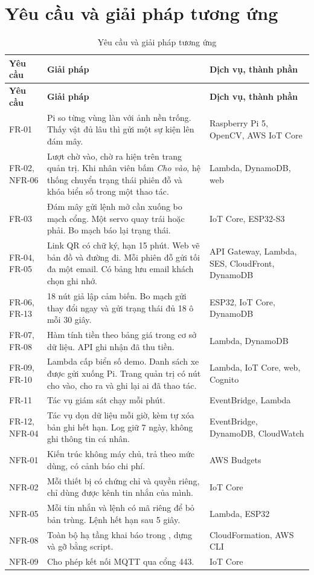 \section{Yêu cầu và giải pháp tương ứng}

\begin{longtable}{@{}P{2.4cm}P{6.6cm}P{5.1cm}@{}}
\caption{Yêu cầu và giải pháp tương ứng}\label{tab:anhxa}\\
\toprule
\textbf{Yêu cầu} & \textbf{Giải pháp} & \textbf{Dịch vụ, thành phần} \\ \midrule
\endfirsthead
\toprule
\textbf{Yêu cầu} & \textbf{Giải pháp} & \textbf{Dịch vụ, thành phần} \\ \midrule
\endhead
FR-01 & Pi so từng vùng làn với ảnh nền trống. Thấy vật đủ lâu thì gửi một sự kiện lên đám mây. & Raspberry Pi 5, OpenCV, AWS IoT Core \\
FR-02, NFR-06 & Lượt chờ vào, chờ ra hiện trên trang quản trị. Khi nhân viên bấm \emph{Cho vào}, hệ thống chuyển trạng thái phiên đỗ và khóa biển số trong một thao tác. & Lambda, DynamoDB, web \\
FR-03 & Đám mây gửi lệnh mở cần xuống bo mạch cổng. Một servo quay trái hoặc phải. Bo mạch báo lại trạng thái. & IoT Core, ESP32-S3 \\
FR-04, FR-05 & Link QR có chữ ký, hạn 15 phút. Web vẽ bản đồ và đường đi. Mỗi phiên đỗ gửi tối đa một email. Có bảng lưu email khách chọn ghi nhớ. & API Gateway, Lambda, SES, CloudFront, DynamoDB \\
FR-06, FR-13 & 18 nút giả lập cảm biến. Bo mạch gửi thay đổi ngay và gửi trạng thái đủ 18 ô mỗi 30 giây. & ESP32, IoT Core, DynamoDB \\
FR-07, FR-08 & Hàm tính tiền theo bảng giá trong cơ sở dữ liệu. API ghi nhận đã thu tiền. & Lambda, DynamoDB \\
FR-09, FR-10 & Lambda cấp biển số demo. Danh sách xe được gửi xuống Pi. Trang quản trị có nút cho vào, cho ra và ghi lại ai đã thao tác. & Lambda, IoT Core, web, Cognito \\
FR-11 & Tác vụ giám sát chạy mỗi phút. & EventBridge, Lambda \\
FR-12, NFR-04 & Tác vụ dọn dữ liệu mỗi giờ, kèm tự xóa bản ghi hết hạn. Log giữ 7 ngày, không ghi thông tin cá nhân. & EventBridge, DynamoDB, CloudWatch \\
NFR-01 & Kiến trúc không máy chủ, trả theo mức dùng, có cảnh báo chi phí. & AWS Budgets \\
NFR-02 & Mỗi thiết bị có chứng chỉ và quyền riêng, chỉ dùng được kênh tin nhắn của mình. & IoT Core \\
NFR-05 & Mỗi tin nhắn và lệnh có mã riêng để bỏ bản trùng. Lệnh hết hạn sau 5 giây. & Lambda, ESP32 \\
NFR-08 & Toàn bộ hạ tầng khai báo trong , dựng và gỡ bằng script. & CloudFormation, AWS CLI \\
NFR-09 & Cho phép kết nối MQTT qua cổng 443. & IoT Core \\
\bottomrule
\end{longtable}


